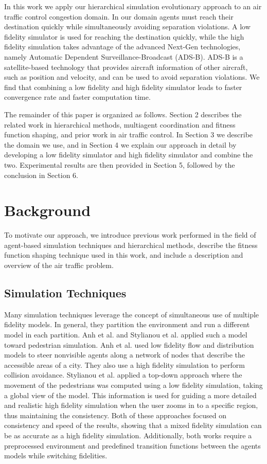 \documentclass{sig-alternate}
\begin{document}
In this work we apply our hierarchical simulation evolutionary approach to an air traffic control congestion domain. In our domain agents must reach their destination quickly while simultaneously avoiding separation violations. A low fidelity simulator is used for reaching the destination quickly, while the high fidelity simulation takes advantage of the advanced Next-Gen \cite{next-gen} technologies, namely Automatic Dependent Surveillance-Broadcast (ADS-B). ADS-B is a satellite-based technology that provides aircraft information of other aircraft, such as position and velocity, and can be used to avoid separation violations. We find that combining a low fidelity and high fidelity simulator leads to faster convergence rate and faster computation time.

The remainder of this paper is organized as follows. Section 2 describes the related work in hierarchical methods, multiagent coordination and fitness function shaping, and prior work in air traffic control. In Section 3 we describe the domain we use, and in Section 4 we explain our approach in detail by developing a low fidelity simulator and high fidelity simulator and combine the two. Experimental results are then provided in Section 5, followed by the conclusion in Section 6.

\section{Background}

To motivate our approach, we introduce previous work performed in the field of agent-based simulation techniques and hierarchical methods, describe the fitness function shaping technique used in this work, and include a description and overview of the air traffic problem.

\subsection{Simulation Techniques}

Many simulation techniques leverage the concept of simultaneous use of multiple fidelity models. In general, they partition the environment and run a different model in each partition. Anh et al. \cite{Anh:2011:HMP:2183423.2183461} and Stylianou et al. \cite{Stylianou04scalablepedestrian} applied such a model toward pedestrian simulation. Anh et al. used low fidelity flow and distribution models to steer nonvisible agents along a network of nodes that describe the accessible areas of a city. They also use a high fidelity simulation to perform collision avoidance. Stylianou et al. applied a top-down approach where the movement of the pedestrians was computed using a low fidelity simulation, taking a global view of the model. This information is used for guiding a more detailed and realistic high fidelity simulation when the user zooms in to a specific region, thus maintaining the consistency. Both of these approaches focused on consistency and speed of the results, showing that a mixed fidelity simulation can be as accurate as a high fidelity simulation. Additionally, both works require a preprocessed environment and predefined transition functions between the agents models while switching fidelities.
\end{document}
